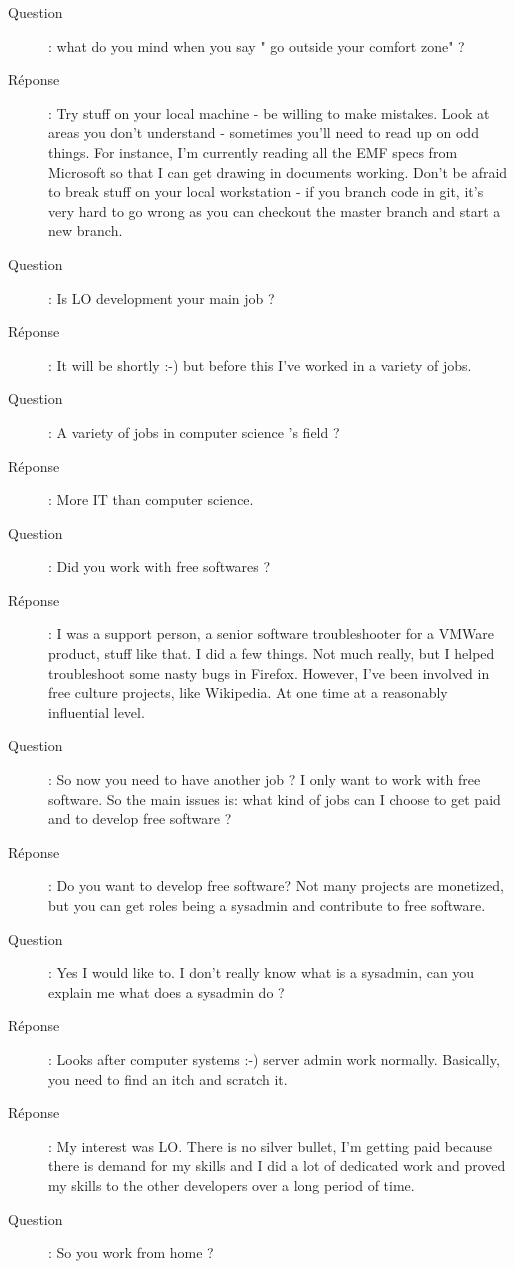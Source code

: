\documentclass[a4paper,12pt, draft]{report}
\begin{document}
\begin{description}
\item [Question]:  what do you mind when you say " go outside your comfort zone" ?
\item [Réponse]:  Try stuff on your local machine - be willing to make mistakes. Look at areas you don't understand - sometimes you'll need to read up on odd things. For instance, I'm currently reading all the EMF specs from Microsoft so that I can get drawing in documents working. Don't be afraid to break stuff on your local workstation - if you branch code in git, it's very hard to go wrong as you can checkout the master branch and start a new branch.
\item [Question]:  Is LO development your main job ?
\item [Réponse]:  It will be shortly :-) but before this I've worked in a variety of jobs.
\item [Question]:  A variety of jobs in computer science 's field ?
\item [Réponse]:  More IT than computer science.
\item [Question]:  Did you work with free softwares ?
\item [Réponse]:  I was a support person, a senior software troubleshooter for a VMWare product, stuff like that. I did a few things. Not much really, but I helped troubleshoot some nasty bugs in Firefox. However, I've been involved in free culture projects, like Wikipedia. At one time at a reasonably influential level.
\item [Question]:  So now you need to have another job ? I  only want to work with free software. So the main issues is: what kind of jobs can I choose to get paid and to develop free software ?
\item [Réponse]:  Do you want to develop free software? Not many projects are monetized, but you can get roles being a sysadmin and contribute to free software.
\item [Question]:  Yes I would like to. I don't really know what is a sysadmin, can you explain me what does a sysadmin do ?
\item [Réponse]:  Looks after computer systems :-) server admin work normally. Basically, you need to find an itch and scratch it.
\item [Réponse]:  My interest was LO. There is no silver bullet, I'm getting paid because there is demand for my skills and I did a lot of dedicated work and proved my skills to the other developers over a long period of time.
\item [Question]:  So you work from home ?

\end{description}
\end{document}
